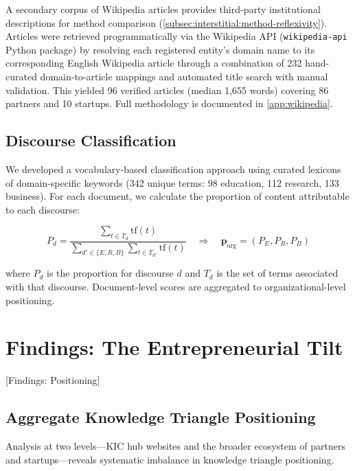 \documentclass[../main.tex]{subfiles}
\begin{document}
A secondary corpus of Wikipedia articles provides third-party institutional
descriptions for method comparison (\cref{subsec:interstitial:method-reflexivity}).
Articles were retrieved programmatically via the Wikipedia API
(\texttt{wikipedia-api} Python package) by resolving each registered entity's
domain name to its corresponding English Wikipedia article through a combination
of 232 hand-curated domain-to-article mappings and automated title search with
manual validation. This yielded 96 verified articles (median 1,655 words) covering
86 partners and 10 startups. Full methodology is documented in
\cref{app:wikipedia}.

\subsection{Discourse Classification}

We developed a vocabulary-based classification approach using curated lexicons of domain-specific keywords (342 unique terms: 98 education, 112 research, 133 business). For each document, we calculate the proportion of content attributable to each discourse:

\begin{equation}
    P_d = \frac{\sum_{t \in T_d} \text{tf}(t)}{\sum_{d' \in \{E,R,B\}} \sum_{t \in T_{d'}} \text{tf}(t)} \quad \Rightarrow \quad \mathbf{p}_{\text{org}} = (P_E, P_R, P_B)
\end{equation}

where $P_d$ is the proportion for discourse $d$ and $T_d$ is the set of terms associated with that discourse. Document-level scores are aggregated to organizational-level positioning.


\section{Findings: The Entrepreneurial Tilt}[Findings: Positioning]

\subsection{Aggregate Knowledge Triangle Positioning}

Analysis at two levels---KIC hub websites and the broader ecosystem of partners and startups---reveals systematic imbalance in knowledge triangle positioning.
\end{document}
